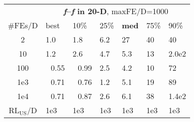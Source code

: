\begin{tabular}{c|llllll}
 & \multicolumn{6}{|c}{\textbf{\textit{f}\raisebox{-0.35ex}{1}--\textit{f}\raisebox{-0.35ex}{24} in 20-D}, maxFE/D=1000}\\
\#FEs/D & best & 10\% & 25\% & \textbf{med} & 75\% & 90\%\\
2 & \hspace*{1ex}1.0 & \hspace*{1ex}1.8 & \hspace*{1ex}6.2 & 27 & 40 & 40\\
10 & \hspace*{1ex}1.2 & \hspace*{1ex}2.6 & \hspace*{1ex}4.7 & \hspace*{1ex}5.3 & 13 & 2.0e2\\
100 & ~\,0.55 & ~\,0.99 & \hspace*{1ex}2.5 & \hspace*{1ex}4.2 & 10 & 72\\
1e3 & ~\,0.71 & ~\,0.76 & \hspace*{1ex}1.2 & \hspace*{1ex}5.1 & 19 & 89\\
1e4 & ~\,0.71 & ~\,0.87 & \hspace*{1ex}2.6 & \hspace*{1ex}6.1 & 38 & 1.4e2\\
$\text{RL}_{\text{US}}$/D & 1e3 & 1e3 & 1e3 & 1e3 & 1e3 & 1e3
\end{tabular}
